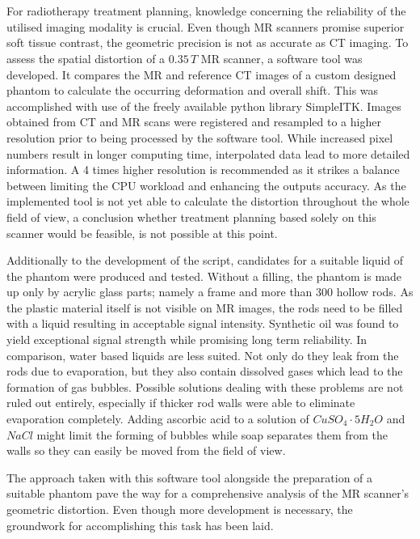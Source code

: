 \let\oldcleardoublepage\cleardoublepage
\renewcommand\cleardoublepage{}

\chapter*{\abstractname}
For radiotherapy treatment planning, knowledge concerning the reliability of the utilised imaging modality is crucial.
Even though MR scanners promise superior soft tissue contrast, the geometric precision is not as accurate as CT imaging.
To assess the spatial distortion of a $0.35\, T$ MR scanner, a software tool was developed.
It compares the MR and reference CT images of a custom designed phantom to calculate the occurring deformation and overall shift.
This was accomplished with use of the freely available python library SimpleITK.
Images obtained from CT and MR scans were registered and resampled to a higher resolution prior to being processed by the software tool.
While increased pixel numbers result in longer computing time, interpolated data lead to more detailed information.
A 4 times higher resolution is recommended as it strikes a balance between limiting the CPU workload and enhancing the outputs accuracy.
As the implemented tool is not yet able to calculate the distortion throughout the whole field of view, a conclusion whether treatment planning based solely on this scanner would be feasible, is not possible at this point.

Additionally to the development of the script, candidates for a suitable liquid of the phantom were produced and tested.
Without a filling, the phantom is made up only by acrylic glass parts; namely a frame and more than 300 hollow rods.
As the plastic material itself is not visible on MR images, the rods need to be filled with a liquid resulting in acceptable signal intensity.
Synthetic oil was found to yield exceptional signal strength while promising long term reliability.
In comparison, water based liquids are less suited.
Not only do they leak from the rods due to evaporation, but they also contain dissolved gases which lead to the formation of gas bubbles.
Possible solutions dealing with these problems are not ruled out entirely, especially if thicker rod walls were able to eliminate evaporation completely.
Adding ascorbic acid to a solution of $CuSO_4\cdot5H_2O$ and $NaCl$ might limit the forming of bubbles while soap separates them from the walls so they can easily be moved from the field of view.

The approach taken with this software tool alongside the preparation of a suitable phantom pave the way for a comprehensive analysis of the MR scanner's geometric distortion.
Even though more development is necessary, the groundwork for accomplishing this task has been laid.


\let\cleardoublepage\oldcleardoublepage
\newpage
